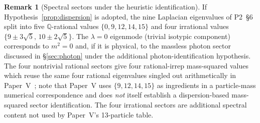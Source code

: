 \documentclass[11pt]{article}
\theoremstyle{definition}
\newtheorem{remark}[theorem]{Remark}
\newcommand{\Q}{\mathbb{Q}}
\begin{document}
\begin{remark}[Spectral sectors under the heuristic identification]\label{rem:sectors}
If Hypothesis~\ref{prop:dispersion} is adopted, the nine Laplacian eigenvalues of P2~\S 6 split into five $\Q$-rational values $\{0, 9, 12, 14, 15\}$ and four irrational values $\{9\pm 3\sqrt 5,\,10\pm 2\sqrt 5\}$. The $\lambda = 0$ eigenmode (trivial isotypic component) corresponds to $m^2 = 0$ and, if it is physical, to the massless photon sector discussed in \S\ref{sec:photon} under the additional photon-identification hypothesis. The four nontrivial rational sectors give four rational-irrep mass-squared values which reuse the same four rational eigenvalues singled out arithmetically in Paper~V~\citep{SmartV}; note that Paper~V uses $\{9, 12, 14, 15\}$ as ingredients in a particle-mass numerical correspondence and does \emph{not} itself establish a dispersion-based mass-squared sector identification. The four irrational sectors are additional spectral content not used by Paper~V's 13-particle table.
\end{remark}
\end{document}
